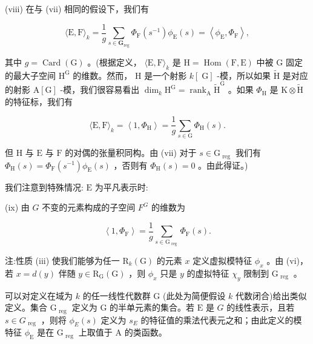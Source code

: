\documentclass[10pt]{article}
\begin{document}
(viii) 在与 (vii) 相同的假设下，我们有

\[
\langle \mathrm{E},\mathrm{F}{\rangle }_{k} = \frac{1}{g}\mathop{\sum }\limits_{{s \in  {\mathbf{G}}_{\mathrm{{reg}}}}}{\Phi }_{\mathrm{F}}\left( {s}^{-1}\right) {\phi }_{\mathrm{E}}\left( s\right)  = \left\langle  {{\phi }_{\mathrm{E}},{\Phi }_{\mathrm{F}}}\right\rangle  ,
\]

其中 \(g = \operatorname{Card}\left( \mathrm{G}\right)\) 。(根据定义， \(\langle \mathrm{E},\mathrm{F}{\rangle }_{k}\) 是 \(\mathrm{H} = \operatorname{Hom}\left( {\mathrm{F},\mathrm{E}}\right)\) 中被 \(\mathrm{G}\) 固定的最大子空间 \({\mathrm{H}}^{\mathrm{G}}\) 的维数。然而， \(\mathrm{H}\) 是一个射影 \(k\left\lbrack  \mathrm{\;G}\right\rbrack\) -模，所以如果 \(\widetilde{\mathrm{H}}\) 是对应的射影 \(\mathrm{A}\left\lbrack  \mathrm{G}\right\rbrack\) -模，我们很容易看出 \({\dim }_{k}{\mathrm{H}}^{\mathrm{G}} = {\operatorname{rank}}_{\mathrm{A}}{\widetilde{\mathrm{H}}}^{\mathrm{G}}\) 。如果 \({\Phi }_{\mathrm{H}}\) 是 \(\mathrm{K} \otimes  \widetilde{\mathrm{H}}\) 的特征标，我们有

\[
\langle \mathrm{E},\mathrm{F}{\rangle }_{k} = \left\langle  {1,{\Phi }_{\mathrm{H}}}\right\rangle   = \frac{1}{g}\mathop{\sum }\limits_{{s \in  \mathrm{G}}}{\Phi }_{\mathrm{H}}\left( s\right) .
\]

但 \(\mathrm{H}\) 与 \(\mathrm{E}\) 与 \(\mathrm{F}\) 的对偶的张量积同构。由 (vii) 对于 \(s \in  {\mathrm{G}}_{\text{ reg }}\) 我们有 \({\Phi }_{\mathrm{H}}\left( s\right)  = {\Phi }_{\mathrm{F}}\left( {s}^{-1}\right) {\phi }_{\mathrm{E}}\left( s\right)\) ，否则有 \({\Phi }_{\mathrm{H}}\left( s\right)  = 0\) 。由此得证。)

我们注意到特殊情况: \(\mathrm{E}\) 为平凡表示时:

(ix) 由 \(G\) 不变的元素构成的子空间 \({F}^{G}\) 的维数为

\[
\left\langle  {1,{\Phi }_{\mathrm{F}}}\right\rangle   = \frac{1}{g}\mathop{\sum }\limits_{{s \in  {\mathrm{G}}_{\text{ reg }}}}{\Phi }_{\mathrm{F}}\left( s\right) .
\]

注:性质 (iii) 使我们能够为任一 \({\mathrm{R}}_{k}\left( \mathrm{G}\right)\) 的元素 \(x\) 定义虚拟模特征 \({\phi }_{x}\) 。由 (vi)，若 \(x = d\left( y\right)\) 伴随 \(y \in  {\mathrm{R}}_{\mathrm{G}}\left( \mathrm{G}\right)\) ，则 \({\phi }_{x}\) 只是 \(y\) 的虚拟特征 \({\chi }_{y}\) 限制到 \({\mathrm{G}}_{\text{ reg }}\) 。

可以对定义在域为 \(k\) 的任一线性代数群 \(\mathrm{G}\) (此处为简便假设 \(k\) 代数闭合)给出类似定义。集合 \({\mathrm{G}}_{\text{ reg }}\) 定义为 \(\mathrm{G}\) 的半单元素的集合。若 \(\mathrm{E}\) 是 \(G\) 的线性表示，且若 \(s \in  {G}_{\text{ reg }}\) ，则将 \({\phi }_{E}\left( s\right)\) 定义为 \({s}_{E}\) 的特征值的乘法代表元之和；由此定义的模特征 \({\phi }_{\mathrm{E}}\) 是在 \({\mathrm{G}}_{\text{ reg }}\) 上取值于 \(\mathrm{A}\) 的类函数。
\end{document}

